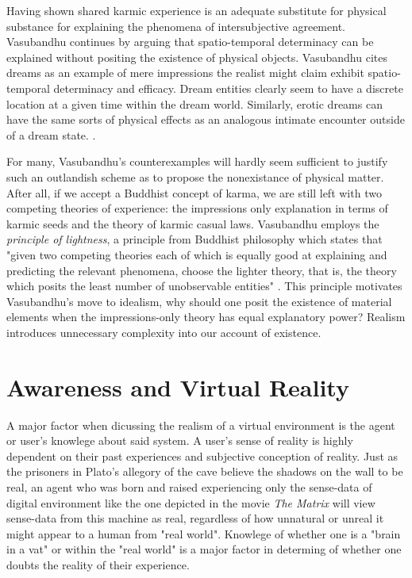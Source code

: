  Having shown shared karmic experience is an adequate substitute for physical substance for explaining the phenomena of intersubjective agreement.  Vasubandhu continues by arguing that spatio-temporal determinacy can be explained without positing the existence of physical objects. Vasubandhu cites dreams as an example of mere impressions the realist might claim exhibit spatio-temporal determinacy and efficacy. Dream entities clearly seem to have a discrete location at a given time within the dream world. Similarly, erotic dreams can have the same sorts of physical effects as an analogous intimate encounter outside of a dream state. \cite{siderits2007buddhism}.
 \newline
 
 For many, Vasubandhu's counterexamples will hardly seem sufficient to justify such an outlandish scheme as to propose the nonexistance of physical matter. After all, if we accept a Buddhist concept of karma, we are still left with two competing theories of experience: the impressions only explanation in terms of karmic seeds and the theory of karmic casual laws. \cite{siderits2007buddhism} Vasubandhu employs the \textit{principle of lightness}, a principle from Buddhist philosophy which states that "given two competing theories each of which is equally good at explaining and predicting the relevant phenomena, choose the lighter theory, that is, the theory which posits the least number of unobservable entities" \cite{siderits2007buddhism}. This principle motivates Vasubandhu's move to idealism, why should one posit the existence of material elements when the impressions-only theory has equal explanatory power? Realism introduces unnecessary complexity into our account of existence.  



  \section{Awareness and Virtual Reality}
A major factor when dicussing the realism of a virtual environment is the agent or user's knowlege about said system. A user's sense of reality is highly dependent on their past experiences and subjective conception of reality. Just as the prisoners in Plato's  allegory of the cave believe the shadows on the wall to be real, an agent who was born and raised experiencing only the sense-data of digital environment like the one depicted in the movie \textit{The Matrix} will view sense-data from this machine as real, regardless of how unnatural or unreal it might appear to a human from "real world". Knowlege of whether one is a "brain in a vat" or within the "real world" is a major factor in determing of whether one doubts the reality of their experience. 
